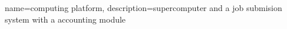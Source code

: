 
{
	name={computing platform},
	description={supercomputer and a job submision system with a accounting module}
}